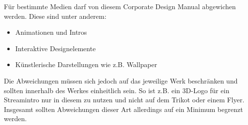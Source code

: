 \documentclass{article}
\begin{document}
Für bestimmte Medien darf von diesem Corporate Design Manual abgewichen werden.
Diese sind unter anderem:

\begin{itemize}
\item Animationen und Intros
\item Interaktive Designelemente
\item Künstlerische Darstellungen wie z.B. Wallpaper
\end{itemize}

Die Abweichungen müssen sich jedoch auf das jeweilige Werk beschränken und sollten innerhalb des Werkes einheitlich sein.
So ist z.B. ein 3D-Logo für ein Streamintro nur in diesem zu nutzen und nicht auf dem Trikot oder einem Flyer.
Insgesamt sollten Abweichungen dieser Art allerdings auf ein Minimum begrenzt werden.
\end{document}
